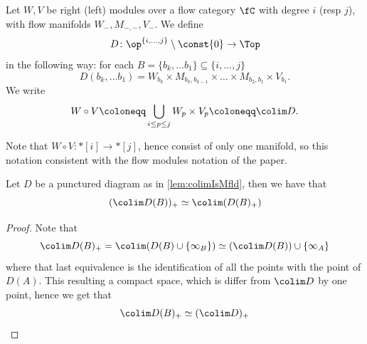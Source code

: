 \begin{defn}\label{def:CompCat}
    Let $W,V$ be right (left) modules over a flow category $\fC$ with degree $i$ (resp $j$), with flow manifolds $W_{-},M_{-,-},V_{-}$. We define
    \begin{equation*}
        D \colon \op^{\{i,\dots, j\}} \setminus \const{0} \to \Top
    \end{equation*}
    in the following way: for each $B = \{b_k,\dots b_1\} \subseteq \{i,\dots, j\}$
    \begin{equation*}
        D(b_k,\dots b_1) = W_{b_k} \times M_{b_k,b_{k-1}} \times \dots \times M_{b_2,b_1} \times V_{b_1}.
    \end{equation*}
    We write
    \begin{equation*}   
        W \circ V \coloneqq \bigcup_{i \leq p \leq j} W_{p} \times V_{p} \coloneqq \colim D.
    \end{equation*}
\end{defn}
Note that $W \circ V: *[i] \to *[j]$, hence consist of only one manifold, so this notation consistent with the flow modules notation of the paper.

\begin{claim}\label{claim:compColim}
    Let $D$ be a punctured diagram as in \cref{lem:colimIsMfld}, then we have that
    \begin{equation*}
        (\colim D(B))_+ \simeq \colim (D(B)_+)
    \end{equation*}
\end{claim}
\begin{proof}
    Note that 
    \begin{equation*}
        \colim D(B)_+ = \colim (D(B) \cup \{\infty_B\}) \simeq (\colim D(B)) \cup \{\infty_A\}
    \end{equation*}
    where that last equivalence is the identification of all the points with the point of $D(A)$. This resulting a compact space, which is differ from $\colim D$ by one point, hence we get that 
    \begin{equation*}
        \colim D(B)_+ \simeq (\colim D)_+
    \end{equation*}
\end{proof}


